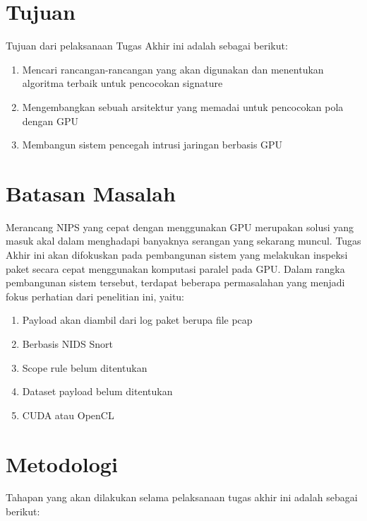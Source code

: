 \section{Tujuan}

Tujuan dari pelaksanaan Tugas Akhir ini adalah sebagai berikut:

\begin{enumerate}
    \item Mencari rancangan-rancangan yang akan digunakan dan menentukan algoritma terbaik untuk pencocokan signature
    \item Mengembangkan sebuah arsitektur yang memadai untuk pencocokan pola dengan GPU
    \item Membangun sistem pencegah intrusi jaringan berbasis GPU
\end{enumerate}

\section{Batasan Masalah}

Merancang NIPS yang cepat dengan menggunakan GPU merupakan solusi yang masuk akal dalam menghadapi banyaknya serangan yang sekarang muncul. Tugas Akhir ini akan difokuskan pada pembangunan sistem yang melakukan inspeksi paket secara cepat menggunakan komputasi paralel pada GPU. Dalam rangka pembangunan sistem tersebut, terdapat beberapa permasalahan yang menjadi fokus perhatian dari penelitian ini, yaitu:

\begin{enumerate}
    \item Payload akan diambil dari log paket berupa file pcap
    \item Berbasis NIDS Snort
    \item Scope rule belum ditentukan
    \item Dataset payload belum ditentukan
    \item CUDA atau OpenCL
\end{enumerate}

\section{Metodologi}

Tahapan yang akan dilakukan selama pelaksanaan tugas akhir ini adalah sebagai berikut:

